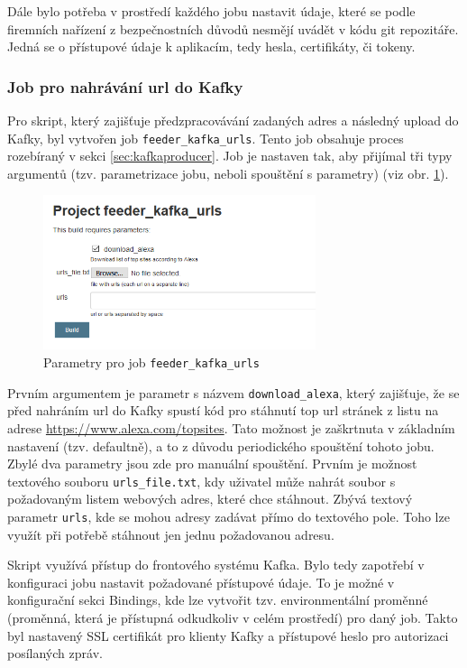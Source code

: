 \documentclass[thesis=M,czech,hidelinks]{FITthesis}[2013/05/06]
\begin{document}
Dále bylo potřeba v prostředí každého jobu nastavit údaje, které se podle firemních nařízení z bezpečnostních důvodů nesmějí uvádět v kódu git repozitáře. Jedná se o přístupové údaje k aplikacím, tedy hesla, certifikáty, či tokeny.


\subsubsection{Job pro nahrávání url do Kafky}
Pro skript, který zajišťuje předzpracovávání zadaných adres a následný upload do Kafky, byl vytvořen job \texttt{feeder_kafka_urls}. Tento job obsahuje proces rozebíraný v sekci \ref{sec:kafkaproducer}. Job je nastaven tak, aby přijímal tři typy argumentů (tzv. parametrizace jobu, neboli spouštění s parametry) (viz obr. \ref{fig:kafka_feed}). 

\begin{figure}[h]
	\centering
	\includegraphics[width=8cm]{pictures/jenkins_kafka_feed.png}
	\caption{Parametry pro job \texttt{feeder_kafka_urls}}
	\label{fig:kafka_feed}
\end{figure}

Prvním argumentem je parametr s názvem \texttt{download_alexa}, který zajišťuje, že se před nahráním url do Kafky spustí kód pro stáhnutí top url stránek z listu na adrese \url{https://www.alexa.com/topsites}. Tato možnost je zaškrtnuta v základním nastavení (tzv. defaultně), a to z důvodu periodického spouštění tohoto jobu. Zbylé dva parametry jsou zde pro manuální spouštění. Prvním je možnost textového souboru \texttt{urls_file.txt}, kdy uživatel může nahrát soubor s požadovaným listem webových adres, které chce stáhnout. Zbývá textový parametr \texttt{urls}, kde se mohou adresy zadávat přímo do textového pole. Toho lze využít při potřebě stáhnout jen jednu požadovanou adresu. 

Skript využívá přístup do frontového systému Kafka. Bylo tedy zapotřebí v konfiguraci jobu nastavit požadované přístupové údaje. To je možné v konfigurační sekci Bindings, kde lze vytvořit tzv. environmentální proměnné (proměnná, která je přístupná odkudkoliv v celém prostředí) pro daný job. Takto byl nastavený SSL certifikát pro klienty Kafky a přístupové heslo pro autorizaci posílaných zpráv.
\end{document}
